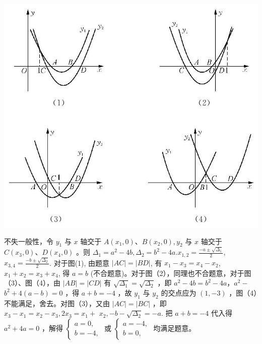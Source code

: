 \documentclass[10pt]{article}
\begin{document}
\includegraphics[max width=\textwidth, center]{2024_10_30_1bf34f7aeb61f11d11d3g-114}

不失一般性，令 $y_{1}$ 与 $x$ 轴交于 $A\left(x_{1}, 0\right) 、 B\left(x_{2}, 0\right), y_{2}$ 与 $x$ 轴交于 $C\left(x_{3}, 0\right) 、 D\left(x_{4}, 0\right)$ 。则 $\Delta_{1}=a^{2}-4 b, \Delta_{2}=b^{2}-4 a . x_{1,2}=\frac{-a \pm \sqrt{\Delta_{1}}}{2}$, $x_{3,4}=\frac{-b \pm \sqrt{\Delta_{2}}}{2}$. 对于图(1), 由题意 $|A C|=|B D|$, 有 $x_{1}-x_{3}=x_{4}-x_{2}$, $x_{1}+x_{2}=x_{3}+x_{4}$, 得 $a=b$ (不合题意)。对于图（2），同理也不合题意，对于图 （3）、图（4），由 $|A B|=|C D|$ 有 $\sqrt{\Delta_{1}}=\sqrt{\Delta_{2}}$ ，即 $a^{2}-4 b=b^{2}-4 a ， a^{2}-$ $b^{2}+4(a-b)=0$ ，得 $a+b=-4$ ，故 $y_{1}$ 与 $y_{2}$ 的交点应为 $(1,-3)$ ，图（4）不能满足，舍去。对图（3），又由 $|A C|=|B C|$ ，即 $x_{3}-x_{1}=x_{2}-x_{3}, 2 x_{3}=x_{1}+$ $x_{2},-b-\sqrt{\Delta_{2}}=-a$. 把 $a+b=-4$ 代入得 $a^{2}+4 a=0$ ，解得 $\left\{\begin{array}{l}a=0, \\ b=-4,\end{array}\right.$ 或 $\left\{\begin{array}{l}a=-4, \\ b=0,\end{array}\right.$ 均满足题意。
\end{document}
